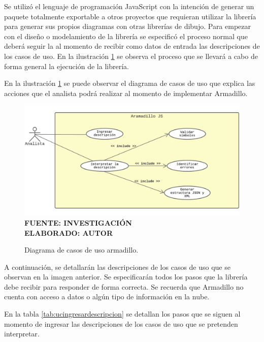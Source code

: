 Se utilizó el lenguaje de programación JavaScript con la intención de generar un paquete totalmente exportable a otros proyectos que requieran utilizar la librería para generar sus propios diagramas con otras librerías de dibujo. Para empezar con el diseño o modelamiento de la librería se especificó el proceso normal que deberá seguir la al momento de recibir como datos de entrada las descripciones de los casos de uso. En la ilustración \ref{fig:armadillocasodeuso} se observa el proceso que se llevará a cabo de forma general la ejecución de la librería.

En la ilustración \ref{fig:armadillocasodeuso} se puede observar el diagrama de casos de uso que explica las acciones que el analista podrá realizar al momento de implementar Armadillo.


\begin{figure}[h!]
	\centering
	\caption{Diagrama de casos de uso armadillo.}
	\includegraphics[width=15cm]{img/modelamientocasodeuso.png}
	\label{fig:armadillocasodeuso}
	\vspace{4mm}
	{\footnotesize \textbf{\\ FUENTE: INVESTIGACIÓN} \textbf{\\ ELABORADO: AUTOR}}
\end{figure} 

A continuación, se detallarán las descripciones de los casos de uso que se observan en la imagen anterior. Se especificarán todos los pasos que la librería debe recibir para responder de forma correcta. Se recuerda que Armadillo no cuenta con acceso a datos o algún tipo de información en la nube.  

\newpage

En la tabla \ref{tab:ucingresardescripcion} se detallan los pasos que se siguen al momento de ingresar las descripciones de los casos de uso que se pretenden interpretar.

